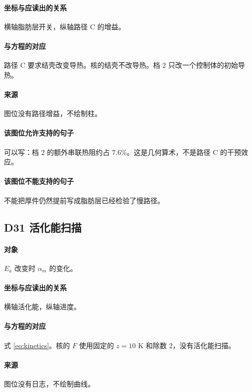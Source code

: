 \paragraph{坐标与应读出的关系}
横轴脂肪层开关，纵轴路径 C 的增益。

\paragraph{与方程的对应}
路径 C 要求结壳改变导热。核的结壳不改导热。档 2 只改一个控制体的初始导热。

\paragraph{来源}
图位没有路径增益，不绘制柱。

\paragraph{该图位允许支持的句子}
可以写：档 2 的额外串联热阻约占 $7.6\%$。这是几何算术，不是路径 C 的干预效应。

\paragraph{该图位不能支持的句子}
不能把厚件仍然提前写成脂肪层已经检验了慢路径。

\subsection{D31 活化能扫描}
\paragraph{对象}
$E_a$ 改变时 $\alpha_m$ 的变化。

\paragraph{坐标与应读出的关系}
横轴活化能，纵轴进度。

\paragraph{与方程的对应}
式 \eqref{eq:kinetics}。核的 $F$ 使用固定的 $z=10$ K 和除数 2，没有活化能扫描。

\paragraph{来源}
图位没有日志，不绘制曲线。

